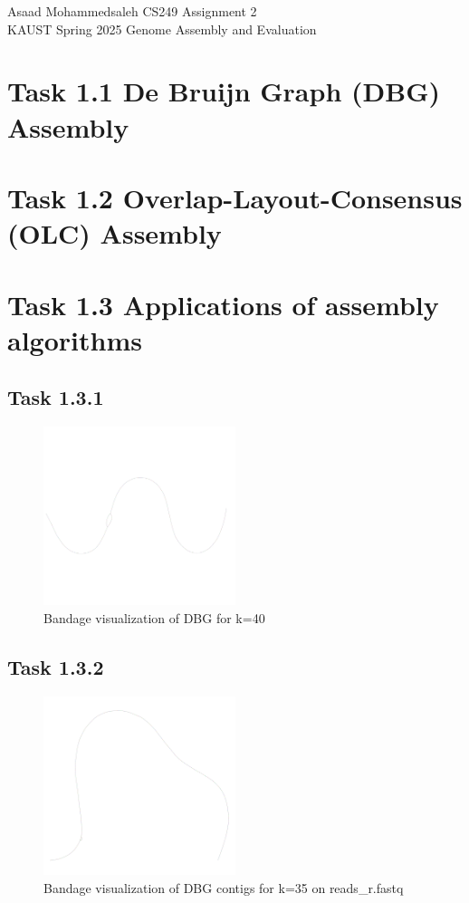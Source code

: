 \documentclass[12pt]{article}
\begin{document}
\noindent Asaad Mohammedsaleh \hfill CS249 Assignment 2\\
KAUST Spring 2025 \hfill Genome Assembly and Evaluation


\hrulefill


\section{Task 1.1 De Bruijn Graph (DBG) Assembly}

\section{Task 1.2 Overlap-Layout-Consensus (OLC) Assembly}

\section{Task 1.3 Applications of assembly algorithms}

\subsection{Task 1.3.1}

\begin{figure}[h]
    \centering
    \includegraphics[width=0.5\textwidth]{../toy_dataset/reads_b_k_40.png}
    \caption{Bandage visualization of DBG for k=40}
\end{figure} 

\subsection{Task 1.3.2}

\begin{figure}[h]
    \centering
    \includegraphics[width=0.5\textwidth]{../toy_dataset/r-k-35.png}
    \caption{Bandage visualization of DBG contigs for k=35 on reads\_r.fastq}
\end{figure} 
\end{document}
